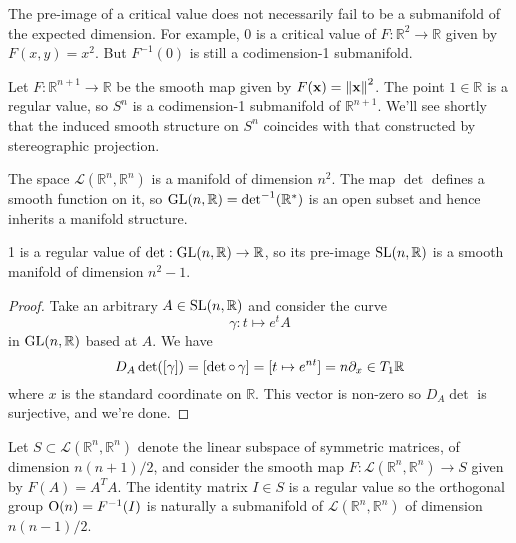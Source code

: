\documentclass[a4paper,11pt]{article}
\begin{document}
	\begin{rmk}
		The pre-image of a critical value does not necessarily fail to be a submanifold of the expected dimension. For example, 0 is a critical value of $F : \mathbb{R}^2 \to \mathbb{R}$ given by $F(x,y) = x^2$. But $F^{-1}(0)$ is still a codimension-1 submanifold. 
	\end{rmk}

	\begin{ex}
		Let $F : \mathbb{R}^{n+1} \to \mathbb{R}$ be the smooth map given by $F(\vb x) = \norm{\vb x}^2$. The point $1 \in \mathbb{R}$ is a regular value, so $S^n$ is a codimension-1 submanifold of $\mathbb{R}^{n+1}$. We'll see shortly that the induced smooth structure on $S^n$ coincides with that constructed by stereographic projection.
	\end{ex}

	\begin{ex}
		The space $\mathcal{L}(\mathbb{R}^n , \mathbb{R}^n)$ is a manifold of dimension $n^2$. The map $\det$ defines a smooth function on it, so $\operatorname{GL}(n, \mathbb{R}) = \det^{-1}(\mathbb{R}^*)$ is an open subset and hence inherits a manifold structure. 
	\end{ex}

	\begin{clm*}
		1 is a regular value of $\det : \operatorname{GL}(n, \mathbb{R}) \to \mathbb{R}$, so its pre-image $\operatorname{SL}(n, \mathbb{R})$ is a smooth manifold of dimension $n^2 - 1$. 
	\end{clm*}

	\begin{proof}
		Take an arbitrary $A \in \operatorname{SL}(n,\mathbb{R})$ and consider the curve
		\[
			\gamma : t \mapsto e^t A
		\]
		in $\operatorname{GL}(n,\mathbb{R})$ based at $A$. We have
		\[
			D_A \det([\gamma]) = [\det \operatorname{\circ} \gamma] = [t \mapsto e ^{nt}] = n \partial_x \in T_1 \mathbb{R}
		\]
		where $x$ is the standard coordinate on $\mathbb{R}$. This vector is non-zero so $D_A \det$ is surjective, and we're done.
	\end{proof}

	\begin{ex}
		Let $S \subset \mathcal{L}(\mathbb{R}^n, \mathbb{R}^n)$ denote the linear subspace of symmetric matrices, of dimension $n(n+1)/2$, and consider the smooth map $F: \mathcal{L}(\mathbb{R}^n, \mathbb{R}^n) \to S$ given by $F(A) = A^T A$. The identity matrix $I \in S$ is a regular value so the orthogonal group $\operatorname{O}(n) = F^{-1}(I)$ is naturally a submanifold of $\mathcal{L}(\mathbb{R}^n,\mathbb{R}^n)$ of dimension $n(n-1)/2$.  
	\end{ex}
\end{document}
